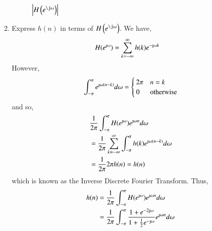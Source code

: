\documentclass[journal,12pt,twocolumn]{IEEEtran}
\renewcommand\thesection{\arabic{section}}
\begin{document}
\begin{enumerate}[label=\thesection.\arabic*]
\begin{figure}[!ht]
\caption{$\abs{H\brak{e^{\j\omega}}}$}
\label{fig:dtft}
\end{figure} 
\item Express $h(n)$ in terms of $H\brak{e^{\j \omega}}$.
\solution We have,
\begin{align}
    H(e^{\text{\j}\omega}) &= \sum_{k = -\infty}^{\infty}h(k)e^{-\text{\j}\omega k}
\end{align}
However,
\begin{align}
    \int_{-\pi}^{\pi}e^{\text{\j}\omega(n - k)}d\omega =
    \begin{cases}
        2\pi & n = k \\
        0 & \textrm{otherwise}
    \end{cases}
\end{align}
and so,
\begin{align}
    &\frac{1}{2\pi}\int_{-\pi}^{\pi}H(e^{\text{\j}\omega})e^{\text{\j}\omega n}d\omega \\
    &= \frac{1}{2\pi}\sum_{k = -\infty}^{\infty}\int_{-\pi}^{\pi}h(k)e^{\text{\j}\omega(n - k)}d\omega \\
    &= \frac{1}{2\pi}2\pi h(n) = h(n)
\end{align}
which is known as the Inverse Discrete Fourier Transform. Thus,
\begin{align}
    h(n) &= \frac{1}{2\pi}\int_{-\pi}^{\pi}H(e^{\text{\j}\omega})e^{\text{\j}\omega n}d\omega \\
         &= \frac{1}{2\pi}\int_{-\pi}^{\pi}\frac{1 + e^{-2\text{\j}\omega}}{1 + \frac{1}{2}e^{-\text{\j}\omega}}e^{\text{\j}\omega n}d\omega
    \label{eq:idtft}
\end{align}  
\end{enumerate}
\end{document}
